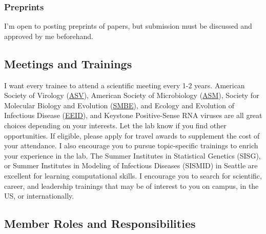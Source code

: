 \documentclass[10pt, letterpaper, twocolumn]{article} %
\begin{document}
\subsubsection{Preprints}
I'm open to posting preprints of papers, but submission must be discussed and approved by me beforehand.

\subsection{Meetings and Trainings}
I want every trainee to attend a scientific meeting every 1-2 years. American Society of Virology (\href{https://asv.org/}{ASV}), American Society of Microbiology (\href{https://asm.org/}{ASM}), Society for Molecular Biology and Evolution (\href{https://smbe.org/smbe/}{SMBE}), and Ecology and Evolution of Infectious Disease (\href{https://www.eeidconference2021.org/}{EEID}), and Keystone Positive-Sense RNA viruses are all great choices depending on your interests. Let the lab know if you find other opportunities. If eligible, please apply for travel awards to supplement the cost of your attendance.\newline
I also encourage you to pursue topic-specific trainings to enrich your experience in the lab. The Summer Institutes in Statistical Genetics (SISG), or Summer Institutes in Modeling of Infectious Diseases (SISMID) in Seattle are excellent for learning computational skills. I encourage you to search for scientific, career, and leadership trainings that may be of interest to you on campus, in the US, or internationally.

\subsection{Member Roles and Responsibilities}
\end{document}
